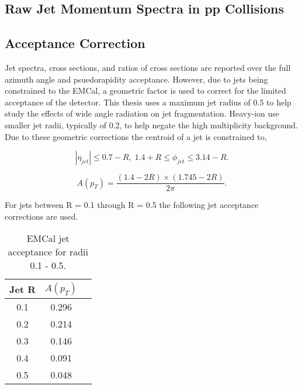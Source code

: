 \subsection{Raw Jet Momentum Spectra in pp Collisions}

\subsection{Acceptance Correction}
Jet spectra, cross sections, and ratios of cross sections are reported over the full azimuth angle and psuedorapidity acceptance.  However, due to jets being constrained to the EMCal, a geometric factor is used to correct for the limited acceptance of the detector.  This thesis uses a maximum jet radius of 0.5 to help study the effects of wide angle radiation on jet fragmentation.  Heavy-ion use smaller jet radii, typically of 0.2, to help negate the high multiplicity background.  Due to these geometric corrections the centroid of a jet is constrained to,

\begin{equation}
|\eta_{jet}| \leq 0.7 - R, \; 1.4 + R \leq \phi_{jet} \leq 3.14 -R.
\label{eq:jetconstration}
\end{equation}

\begin{equation}
A(p_{T}) = \frac{(1.4 - 2R) \times (1.745 - 2R)}{2 \pi}.
\label{eq:acceptance}
\end{equation}

For jets between R = 0.1 through R = 0.5 the following jet acceptance corrections are used.

\begin{table}[hb]
\label{tab:AcceptanceFactor}
\begin{center}
\begin{tabular}[b]{|c|c|c|}
	\hline
	Jet R & $A(p_{T})$ \\ \hline
	0.1 & 0.296 \\ \hline
	0.2 & 0.214\\ \hline
	0.3 & 0.146\\ \hline
	0.4 & 0.091\\ \hline
	0.5 & 0.048\\ \hline
\end{tabular}
\end{center}
\caption{EMCal jet acceptance for radii 0.1 - 0.5.}
\end{table}








